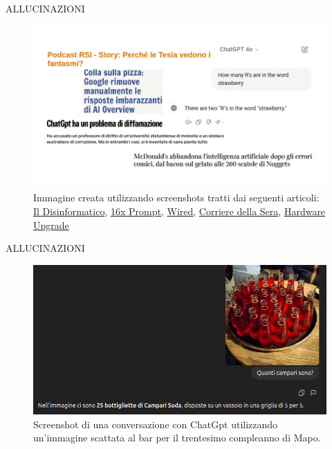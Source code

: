\documentclass[aspectratio=1610]{beamer}
\begin{document}
\begin{frame}{ALLUCINAZIONI}
    \begin{figure}
        \includegraphics[width=.9\linewidth]{img/allucinazioni.png}
        \caption{
            Immagine creata utilizzando screenshots tratti dai seguenti articoli:
            \href{https://attivissimo.blogspot.com/2023/05/podcast-rsi-story-perche-le-tesla.html}{Il Disinformatico}, 
            \href{https://prompt.16x.engineer/blog/why-chatgpt-cant-count-rs-in-strawberry}{16x Prompt}, 
            \href{https://www.wired.it/article/chatgpt-diffamazione-molestie-problema/}{Wired}, 
            \href{https://www.corriere.it/esteri/24_giugno_23/mcdonalds-abbandona-intelligenza-artificiale-e67cd9a6-7ebd-4436-9ff0-de55eb486xlk.shtml}{Corriere della Sera}, 
            \href{https://www.hwupgrade.it/news/web/colla-sulla-pizza-google-rimuove-manualmente-le-risposte-imbarazzanti-di-ai-overview_127538.html}{Hardware Upgrade}
        }
    \end{figure}
\end{frame}

\begin{frame}{ALLUCINAZIONI}
    \begin{figure}
        \includegraphics[width=.9\linewidth]{img/campari.png}
        \caption{
            Screenshot di una conversazione con ChatGpt utilizzando un'immagine scattata al bar per il trentesimo compleanno di Mapo.
        }
    \end{figure}
\end{frame}
\end{document}
